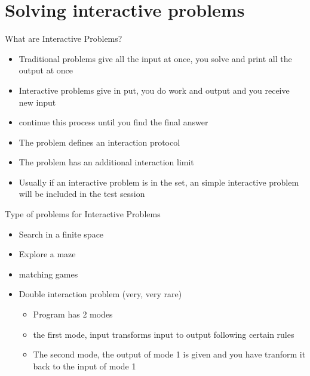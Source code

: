 \documentclass[11pt,pdf, aspectratio=169]{beamer}
\begin{document}
  \section{Solving interactive problems}
  \begin{frame}{What are Interactive Problems?}
    \begin{itemize}
      \item Traditional problems give all the input at once, you solve and print all the output at once
      \item Interactive problems give in put, you do work and output and you receive new input
      \item continue this process until you find the final answer
      \item The problem defines an interaction protocol
      \item The problem has an additional interaction limit
      \item Usually if an interactive problem is in the set, an simple interactive problem will be included in the test session
    \end{itemize}
  \end{frame}
  \begin{frame}{Type of problems for Interactive Problems}
    \begin{itemize}
      \item Search in a finite space
      \item Explore a maze
      \item matching games
      \item Double interaction problem (very, very rare)
      \begin{itemize}
        \item Program has 2 modes
        \item the first mode, input transforms input to output following certain rules
        \item The second mode, the output of mode 1 is given and you have tranform it back to the input of mode 1
      \end{itemize}
    \end{itemize}
  \end{frame}
\end{document}
